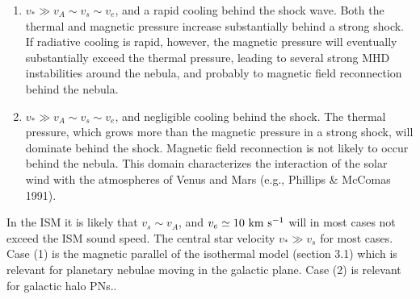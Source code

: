 \documentclass{article}
\def \s{\rm{s}}
\def \km{\rm{km}}
\def \s{~\rm{s}}
\def \km{~\rm{km}}
\begin{document}
\begin{enumerate}
\item $v_\ast \gg v_A \sim v_s \sim v_e$, and a rapid cooling behind the
shock wave.
Both the thermal and magnetic pressure increase substantially behind
a strong shock. If radiative cooling is rapid, however, the magnetic pressure
will eventually substantially exceed the thermal pressure, leading to
several strong MHD instabilities around the nebula, and probably to
magnetic field reconnection behind the nebula. 

\item $v_\ast \gg v_A \sim v_s \sim v_e$, and negligible cooling behind the
shock. The thermal pressure, which grows more than the magnetic pressure in a
strong shock, will dominate behind the shock.
 Magnetic field reconnection is not likely to occur behind the nebula.
This domain characterizes the interaction of the solar wind with
the atmospheres of Venus and Mars (e.g., Phillips \& McComas 1991). 
\end{enumerate}

In the ISM it is likely that $v_s \sim v_A$, and
$v_e \simeq 10 \km \s^{-1}$ will in most cases not exceed the ISM sound speed.
The central star velocity $v_\ast \gg v_s$ for most cases.
Case (1) is the magnetic parallel of the isothermal model (section 3.1)
which is relevant for planetary nebulae moving in the galactic plane.
Case (2) is relevant for galactic halo PNs..
\end{document}
